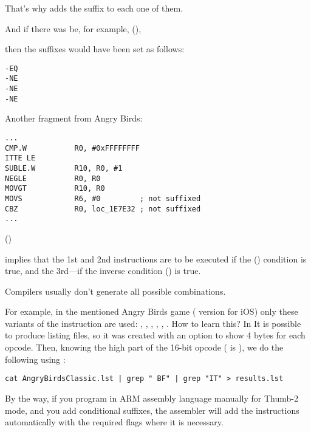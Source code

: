 That's why \IDA adds the  suffix to each one of them. 

And if there was be, for example,  (), 

then the suffixes would have been set as follows:

\begin{lstlisting}
-EQ
-NE
-NE
-NE
\end{lstlisting}

Another fragment from Angry Birds:

\begin{lstlisting}[caption=Angry Birds Classic]
...
CMP.W           R0, #0xFFFFFFFF
ITTE LE
SUBLE.W         R10, R0, #1
NEGLE           R0, R0
MOVGT           R10, R0
MOVS            R6, #0         ; not suffixed
CBZ             R0, loc_1E7E32 ; not suffixed
...
\end{lstlisting}

 () 

implies that the 1st and 2nd instructions are to be executed if the  ()
condition is true, and the 3rd---if the inverse condition (\EMDASH{}) 
is true.

Compilers usually don't generate all possible combinations.

For example, in the mentioned Angry Birds game ( version for iOS)
only these variants of the  instruction are used: 
, , , , , .
\myindex{\GrepUsage}
How to learn this?
In \IDA It is possible to produce listing files, so it was created with an option to show 4 bytes for each opcode.
Then, knowing the high part of the 16-bit opcode ( is ), we do the following using :

\begin{lstlisting}
cat AngryBirdsClassic.lst | grep " BF" | grep "IT" > results.lst
\end{lstlisting}


By the way, if you program in ARM assembly language manually for Thumb-2 mode, 
and you add conditional suffixes,
the assembler will add the  instructions automatically with the required flags where it is necessary.

\myparagraph{\NonOptimizingXcodeIV (\ARMMode)}

